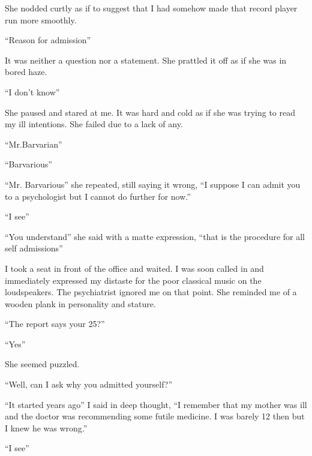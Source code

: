 She nodded curtly as if to suggest that I had somehow made that
record player run more smoothly.



``Reason for admission''



It was neither a question nor a statement. She prattled it off as
if she was in bored haze.



``I don't know''



She paused and stared at me. It was hard and cold as if she was
trying to read my ill intentions. She failed due to a lack of
any.



``Mr.Barvarian''



``Barvarious''



``Mr. Barvarious'' she repeated, still saying it wrong,
``I suppose I can admit you to a psychologist but I cannot do
further for now.''



``I see''



``You understand'' she said with a matte expression,
``that is the procedure for all self admissions''



I took a seat in front of the office and waited. I was soon called
in and immediately expressed my distaste for the poor classical
music on the loudspeakers. The psychiatrist ignored me on that
point. She reminded me of a wooden plank in personality and
stature.



``The report says your 25?''



``Yes''



She seemed puzzled.



``Well, can I ask why you admitted yourself?''



``It started years ago'' I said in deep thought, ``I
remember that my mother was ill and the doctor was recommending
some futile medicine. I was barely 12 then but I knew he was
wrong.''



``I see''



